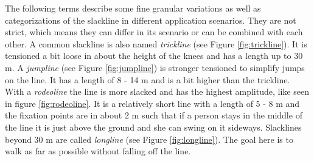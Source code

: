 The following terms describe some fine granular variations as well as categorizations of the slackline in different application scenarios. They are not strict, which means they can differ in its scenario or can be combined with each other. A common slackline is also named \textit{trickline} (see Figure \ref{fig:trickline}). It is tensioned a bit loose in about the height of the knees and has a length up to 30 m. A \textit{jumpline} (see Figure \ref{fig:jumpline}) is stronger tensioned to simplify jumps on the line. It has a length of 8 - 14 m and is a bit higher than the trickline. With a \textit{rodeoline} the line is more slacked and has the highest amplitude, like seen in figure \ref{fig:rodeoline}. It is a relatively short line with a length of 5 - 8 m and the fixation points are in about 2 m such that if a person stays in the middle of the line it is just above the ground and she can swing on it sideways. Slacklines beyond 30 m are called \textit{longline} (see Figure \ref{fig:longline}). The goal here is to walk as far as possible without falling off the line.

